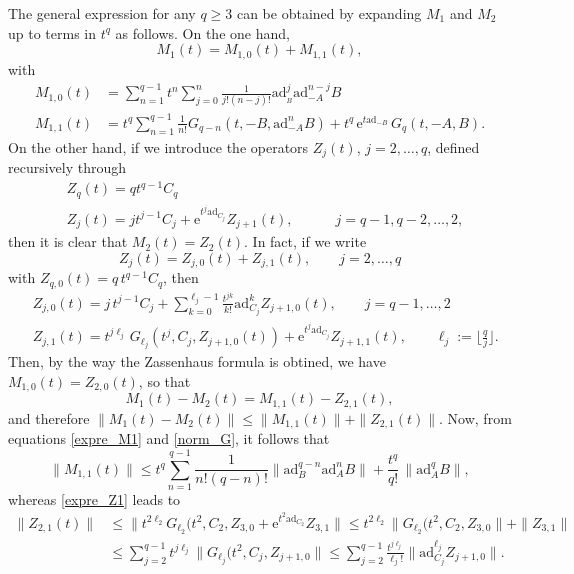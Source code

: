 \documentclass[11pt]{article}
\newcommand{\e}{\ensuremath{\mathrm{e}}}
\newcommand{\ad}{\ensuremath{\mathrm{ad}}}
\begin{document}
The general expression for any $q \ge 3$ can be obtained by expanding $M_1$ and $M_2$ up to terms in $t^q$ as follows. On the one hand,
\[
  M_1(t) = M_{1,0}(t) + M_{1,1}(t),
\]
with
\begin{equation} \label{expre_M1}
\begin{aligned}
 M_{1,0}(t) & = \sum_{n=1}^{q-1} t^n \sum_{j=0}^n \frac{1}{j! (n-j)!} \ad_{_B}^j \ad_{-A}^{n-j} B  \\
 M_{1,1}(t) & =  t^q \sum_{n=1}^{q-1} \frac{1}{n!} G_{q-n}(t, -B, \ad_{-A}^n B) + t^q \, \e^{t \ad_{-B}} \, G_q(t, -A, B).
\end{aligned}
\end{equation}   
On the other hand, if we introduce the operators $Z_j(t)$, $j=2,\ldots, q$, defined recursively through
\begin{equation} \label{zetas_z}
  \begin{aligned}
  & Z_q(t) = q t^{q-1} C_q \\
  & Z_j(t) = j t^{j-1} C_j + \e^{t^j \ad_{C_j}} Z_{j+1}(t), \qquad\quad j= q-1, q-2, \ldots, 2,
 \end{aligned} 
\end{equation}
then it is clear that $M_2(t) = Z_2(t)$. In fact, if we write 
\[
  Z_j(t) = Z_{j,0}(t) + Z_{j,1}(t), \qquad j=2,\ldots, q
\]
with  $Z_{q,0}(t) =  q \, t^{q-1} C_q$, then 
\begin{equation} \label{expre_Z1}
  \begin{aligned}
   & Z_{j,0}(t) = j \, t^{j-1} C_j + \sum_{k=0}^{\ell_j -1} \frac{t^{j k}}{k!} \ad_{C_j}^k Z_{j+1,0}(t), \qquad  j=q-1, \ldots, 2 \\
   & Z_{j,1}(t) =  t^{j \ell_j} \, G_{\ell_j}(t^j, C_j, Z_{j+1,0}(t)) + \e^{t^j \ad_{C_j}} Z_{j+1,1}(t), \qquad \ell_j := \lfloor \frac{q}{j} \rfloor.
  \end{aligned} 
\end{equation}
Then, by the way the Zassenhaus formula is obtined, we have $M_{1,0}(t) = Z_{2,0}(t)$, so that
\[
  M_1(t) - M_2(t) = M_{1,1}(t) - Z_{2,1}(t),
\]
and therefore $\|M_1(t) - M_2(t)\| \le \|M_{1,1}(t)\| + \|Z_{2,1}(t)\|$.  Now, from equations \eqref{expre_M1} and \eqref{norm_G}, it follows that
\[
  \|M_{1,1}(t)\| \le t^q \sum_{n=1}^{q-1} \frac{1}{n! (q-n)!} \|\ad_B^{q-n} \ad_{A}^n B\| +  \frac{t^q}{q!} \, \|\ad_A^q B\|,
\]  
whereas \eqref{expre_Z1} leads to
\[
\begin{aligned}
 \|Z_{2,1}(t)\| & \le \| t^{2 \ell_2} G_{\ell_2}(t^2, C_2, Z_{3,0} + \e^{t^2 \ad_{C_2}} Z_{3,1}\| \le t^{2 \ell_2} \|G_{\ell_2}(t^2, C_2, Z_{3,0}\| + \|Z_{3,1}\| \\
 & \le \sum_{j=2}^{q-1} t^{j \ell_j} \|G_{\ell_j}(t^2, C_j, Z_{j+1,0}\| \le \sum_{j=2}^{q-1} \frac{t^{j \ell_j}}{\ell_j!} \|\ad_{C_j}^{\ell_j} Z_{j+1,0}\|.
\end{aligned}
\]
\end{document}

